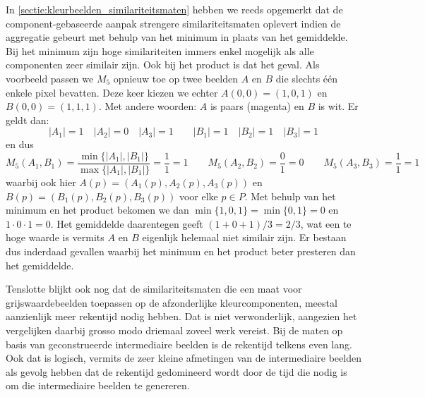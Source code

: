 
In \ref{sectie:kleurbeelden_similariteitsmaten} hebben we reeds opgemerkt dat de 
component-gebaseerde aanpak strengere similariteitsmaten oplevert indien de
aggregatie gebeurt met behulp van het minimum in plaats van het gemiddelde. Bij het
minimum zijn hoge similariteiten immers enkel mogelijk als alle componenten
zeer similair zijn. Ook bij het product is dat het geval. Als voorbeeld passen we
$M_5$ opnieuw toe op twee beelden $A$ en $B$ die slechts \'e\'en enkele pixel bevatten. Deze
keer kiezen we echter $A(0,0)=(1,0,1)$ en $B(0,0)=(1,1,1)$. Met andere woorden: $A$ is paars 
(magenta) en $B$ is wit. Er geldt dan:
\begin{displaymath}
|A_1|=1 \quad |A_2|=0 \quad |A_3|=1 \qquad |B_1|=1 \quad |B_2|=1 \quad |B_3|=1
\end{displaymath}
en dus
\begin{displaymath}
M_5(A_1,B_1)=\frac{\min\{|A_1|,|B_1|\}}{\max\{|A_1|,|B_1|\}}=\frac{1}{1}=1 \qquad 
M_5(A_2,B_2)=\frac{0}{1}=0 \qquad M_5(A_3,B_3)=\frac{1}{1}=1
\end{displaymath}
waarbij ook hier $A(p)=(A_1(p),A_2(p),A_3(p))$ en $B(p)=(B_1(p),B_2(p),B_3(p))$ voor elke $p \in P$.
Met behulp van het minimum en het product bekomen we dan $\min\{1,0,1\}=\min\{0,1\}=0$
en $1 \cdot 0 \cdot 1 = 0$. Het gemiddelde daarentegen geeft $(1+0+1)/3=2/3$, wat
een te hoge waarde is vermits $A$ en $B$ eigenlijk helemaal niet similair zijn.
Er bestaan dus inderdaad gevallen waarbij het minimum en het product beter presteren dan 
het gemiddelde.

Tenslotte blijkt ook nog dat de similariteitsmaten die een maat voor grijswaardebeelden 
toepassen op de afzonderlijke kleurcomponenten, meestal aanzienlijk meer rekentijd nodig hebben. 
Dat is niet verwonderlijk, aangezien het vergelijken daarbij grosso modo driemaal zoveel werk vereist.
Bij de maten op basis van geconstrueerde intermediaire beelden is de rekentijd telkens even
lang. Ook dat is logisch, vermits de zeer kleine afmetingen van de intermediaire beelden als
gevolg hebben dat de rekentijd gedomineerd wordt door de tijd die nodig is om die 
intermediaire beelden te genereren.

